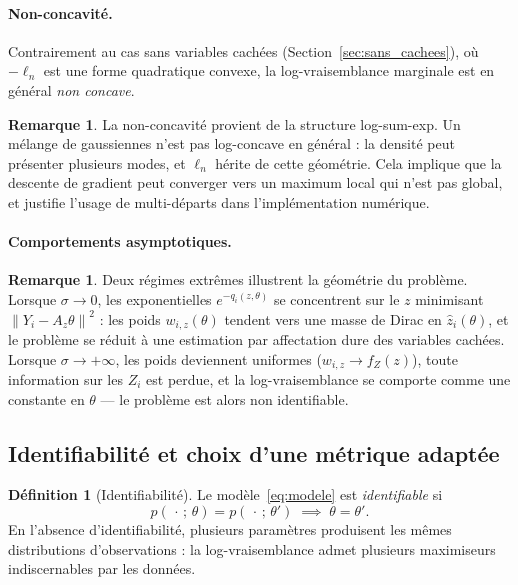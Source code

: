 \documentclass[12pt, a4paper]{article}
\theoremstyle{definition}
\newtheorem{definition}[theorem]{Définition}
\newtheorem{remark}[theorem]{Remarque}
\newcommand{\norm}[1]{\left\|#1\right\|}
\begin{document}
\paragraph{Non-concavité.}

Contrairement au cas sans variables cachées (Section~\ref{sec:sans_cachees}),
où $-\ell_n$ est une forme quadratique convexe, la log-vraisemblance marginale
est en général \emph{non concave}.

\begin{remark}
    La non-concavité provient de la structure log-sum-exp. Un mélange de gaussiennes
    n'est pas log-concave en général : la densité peut présenter plusieurs modes,
    et $\ell_n$ hérite de cette géométrie. Cela implique que la descente de gradient
    peut converger vers un maximum local qui n'est pas global, et justifie l'usage
    de multi-départs dans l'implémentation numérique.
\end{remark}

\paragraph{Comportements asymptotiques.}

\begin{remark}
    Deux régimes extrêmes illustrent la géométrie du problème.
    Lorsque $\sigma \to 0$, les exponentielles $e^{-q_i(z,\theta)}$ se concentrent
    sur le $z$ minimisant $\norm{Y_i - A_z\theta}^2$ : les poids $w_{i,z}(\theta)$
    tendent vers une masse de Dirac en $\hat{z}_i(\theta)$, et le problème se
    réduit à une estimation par affectation dure des variables cachées.
    Lorsque $\sigma \to +\infty$, les poids deviennent uniformes ($w_{i,z} \to f_Z(z)$),
    toute information sur les $Z_i$ est perdue, et la log-vraisemblance se
    comporte comme une constante en $\theta$ — le problème est alors non identifiable.
\end{remark}


\subsection{Identifiabilité et choix d'une métrique adaptée}
\label{subsec:identifiabilite}

\begin{definition}[Identifiabilité]
Le modèle~\eqref{eq:modele} est \emph{identifiable} si
\[
    p(\,\cdot\,;\,\theta) = p(\,\cdot\,;\,\theta')
    \;\implies\; \theta = \theta'.
\]
En l'absence d'identifiabilité, plusieurs paramètres produisent les mêmes
distributions d'observations : la log-vraisemblance admet plusieurs maximiseurs
indiscernables par les données.
\end{definition}
\end{document}
